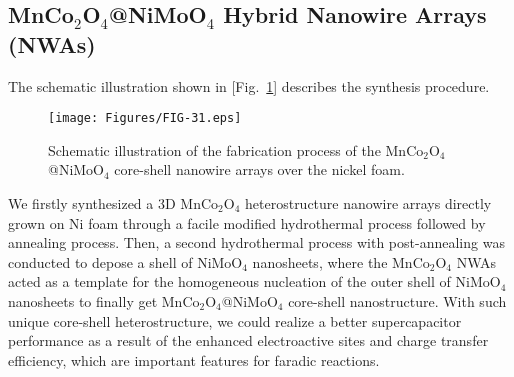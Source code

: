 \documentclass[reprint,amsmath,amssymb,aps,floatfix,
]{revtex4-2}
\begin{document}
\subsection{\label{sec:level3}MnCo$_2$O$_4$@NiMoO$_4$ Hybrid Nanowire Arrays (NWAs)}
The schematic illustration shown in [Fig.~\ref{fig:fig31}] describes the synthesis procedure.
\begin{figure}[b]
    \centering
    \texttt{[image: Figures/FIG-31.eps]}
    \caption{\label{fig:fig31}Schematic illustration of the fabrication process of the MnCo$_2$O$_4$@NiMoO$_4$ core-shell nanowire arrays over the nickel foam.}
    \end{figure}
We firstly synthesized a 3D MnCo$_2$O$_4$ heterostructure nanowire arrays directly grown on Ni foam through a facile modified hydrothermal process followed by annealing process. Then, a second hydrothermal process with post-annealing was conducted to depose a shell of NiMoO$_4$ nanosheets, where the MnCo$_2$O$_4$ NWAs acted as a template for the homogeneous nucleation of the outer shell of NiMoO$_4$ nanosheets to finally get MnCo$_2$O$_4$@NiMoO$_4$ core-shell nanostructure. With such unique core-shell heterostructure, we could realize a better supercapacitor performance as a result of the enhanced electroactive sites and charge transfer efficiency, which are important features for faradic reactions.
\end{document}
